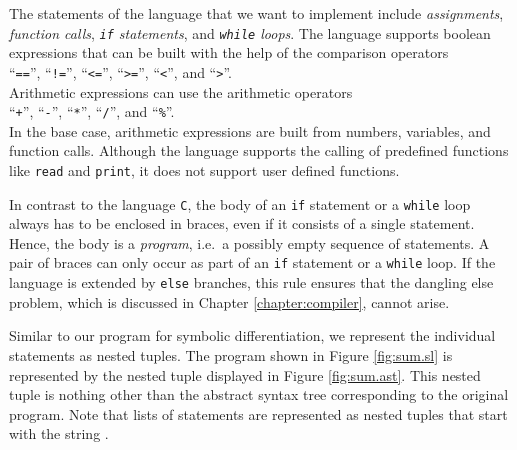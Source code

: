 The statements of the language that we want to implement include \textsl{assignments}, \textsl{function calls},
\textsl{\texttt{if} statements}, and \textsl{\texttt{while} loops}.  The language supports boolean expressions
that can be built with the help of the comparison operators
\\[0.2cm]
\hspace*{1.3cm}
``\texttt{==}'', ``\texttt{!=}'', ``\texttt{<=}'', ``\texttt{>=}'', ``\texttt{<}'', and ``\texttt{>}''.
\\[0.2cm]
Arithmetic expressions can use the arithmetic operators
\\[0.2cm]
\hspace*{1.3cm}
``\texttt{+}'', ``\texttt{-}'', ``\texttt{*}'', ``\texttt{/}'', and ``\texttt{\%}''.
\\[0.2cm]
In the base case, arithmetic expressions are built from numbers, variables, and function calls.
Although the language supports the calling of predefined functions like \texttt{read} and \texttt{print},
it does not support user defined functions.

In contrast to the language \texttt{C}, the body of an \texttt{if} statement or a \texttt{while} loop always
has to be enclosed in braces, even if it consists of a single statement.  Hence, the body is a
\textsl{program}, i.e.~a possibly empty sequence of statements.  A pair of braces can only occur as part of an
\texttt{if} statement or a \texttt{while} loop.  If the language is extended by \texttt{else} branches, this rule
ensures that the dangling else problem, which is discussed in Chapter \ref{chapter:compiler}, cannot
arise.


Similar to our program for symbolic differentiation, we represent the individual statements as
nested tuples.  The program shown in Figure \ref{fig:sum.sl} is represented by the nested tuple displayed in
Figure \ref{fig:sum.ast}.  This nested tuple is nothing other than the abstract syntax tree
corresponding to the original program.  Note that lists of statements are represented as nested tuples
that start with the string .

